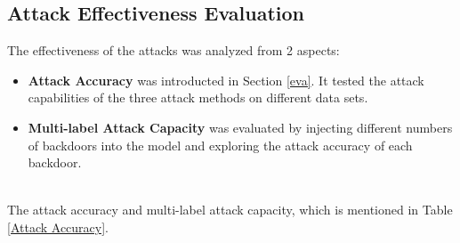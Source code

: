 \documentclass[english,version-2022-01]{uzl-thesis}
\begin{document}
\subsection{Attack Effectiveness Evaluation} The effectiveness of the attacks was analyzed from 2 aspects:
\begin{itemize}
    \item \textbf{Attack Accuracy} was introducted in Section \ref{eva}. It tested the attack capabilities of the three attack methods on different data sets. 
    \item \textbf{Multi-label Attack Capacity} was evaluated by injecting different numbers of backdoors into the model and exploring the attack accuracy of each backdoor.
\end{itemize}\\
The attack accuracy and multi-label attack capacity, which is mentioned in Table \ref{Attack Accuracy}.
\end{document}
